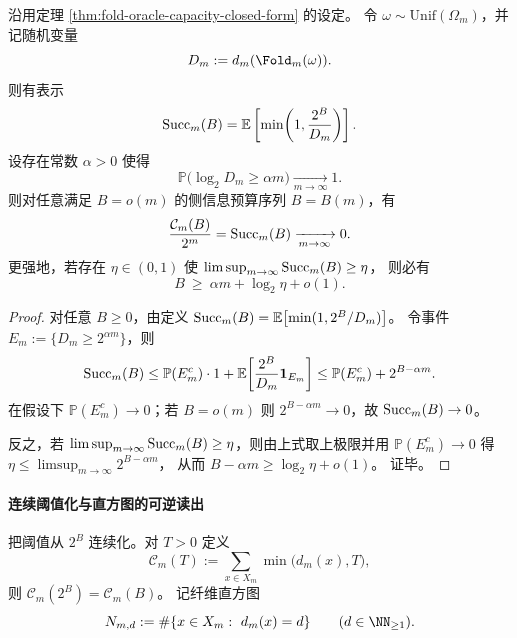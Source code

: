 \begin{theorem}[典型纤维指数膨胀下的零比例可恢复性]\label{thm:fold-oracle-capacity-vanishing-under-typical-exponential-fibers}
沿用定理 \ref{thm:fold-oracle-capacity-closed-form} 的设定。
令 \(\omega\sim\mathrm{Unif}(\Omega_m)\)，并记随机变量
\[
D_m:=d_m(\Fold_m(\omega)).
\]
则有表示
\[
{\rm Succ}_m(B)=\mathbb E\left[\min\!\left(1,\frac{2^B}{D_m}\right)\right].
\]
设存在常数 \(\alpha>0\) 使得
\[
\mathbb P\bigl(\log_2 D_m\ge \alpha m\bigr)\xrightarrow[m\to\infty]{}1.
\]
则对任意满足 \(B=o(m)\) 的侧信息预算序列 \(B=B(m)\)，有
\[
\frac{\mathcal C_m(B)}{2^m}={\rm Succ}_m(B)\xrightarrow[m\to\infty]{}0.
\]
更强地，若存在 \(\eta\in(0,1)\) 使
\(
\limsup_{m\to\infty}{\rm Succ}_m(B)\ge \eta
\)，
则必有
\[
B\ \ge\ \alpha m+\log_2\eta+o(1).
\]
\end{theorem}
\begin{proof}
对任意 \(B\ge 0\)，由定义
\(
{\rm Succ}_m(B)=\mathbb E\bigl[\min(1,2^B/D_m)\bigr]
\)。
令事件 \(E_m:=\{D_m\ge 2^{\alpha m}\}\)，则
\[
{\rm Succ}_m(B)
\le \mathbb P(E_m^c)\cdot 1+\mathbb E\!\left[\frac{2^B}{D_m}\mathbf 1_{E_m}\right]
\le \mathbb P(E_m^c)+2^{B-\alpha m}.
\]
在假设下 \(\mathbb P(E_m^c)\to 0\)；若 \(B=o(m)\) 则 \(2^{B-\alpha m}\to 0\)，故 \({\rm Succ}_m(B)\to 0\)。
\par
反之，若 \(\limsup_{m\to\infty}{\rm Succ}_m(B)\ge \eta\)，则由上式取上极限并用 \(\mathbb P(E_m^c)\to 0\) 得
\(
\eta\le \limsup_{m\to\infty}2^{B-\alpha m}
\)，
从而 \(B-\alpha m\ge \log_2\eta+o(1)\)。
证毕。
\end{proof}

\paragraph{连续阈值化与直方图的可逆读出}
把阈值从 \(2^B\) 连续化。对 \(T>0\) 定义
\begin{equation}\label{eq:fold-oracle-capacity-continuous-threshold}
\mathcal{C}_m(T):=\sum_{x\in X_m}\min\bigl(d_m(x),T\bigr),
\end{equation}
则 \(\mathcal{C}_m(2^B)=\mathcal{C}_m(B)\)。
记纤维直方图
\[
N_{m,d}:=\#\{x\in X_m:\ d_m(x)=d\}\qquad(d\in\NN_{\ge 1}).
\]

